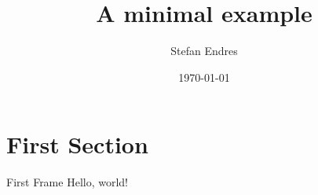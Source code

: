 \documentclass{beamer}
\title{A minimal example}
\date{\today}
\author{Stefan Endres}
\institute{Centre for Modern Beamer Themes}
\begin{document}
  \maketitle
  \section{First Section}
  \begin{frame}{First Frame}
    Hello, world!
  \end{frame}
\end{document}
